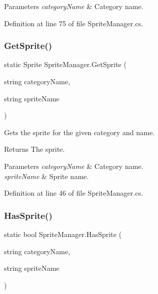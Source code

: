 \begin{DoxyParams}{Parameters}
{\em category\+Name} & Category name.\\
\hline
\end{DoxyParams}


Definition at line 75 of file Sprite\+Manager.\+cs.

\mbox{\label{class_sprite_manager_a726f293c39df8c71073dfae36c8ac9ec}} 
\subsubsection{\texorpdfstring{Get\+Sprite()}{GetSprite()}}
{\footnotesize\ttfamily static Sprite Sprite\+Manager.\+Get\+Sprite (\begin{DoxyParamCaption}\item[{string}]{category\+Name,  }\item[{string}]{sprite\+Name }\end{DoxyParamCaption})\hspace{0.3cm}{\ttfamily [static]}}



Gets the sprite for the given category and name. 

\begin{DoxyReturn}{Returns}
The sprite.
\end{DoxyReturn}

\begin{DoxyParams}{Parameters}
{\em category\+Name} & Category name.\\
\hline
{\em sprite\+Name} & Sprite name.\\
\hline
\end{DoxyParams}


Definition at line 46 of file Sprite\+Manager.\+cs.

\mbox{\label{class_sprite_manager_a1eed6966816d35c500887cc0094b6b26}} 
\subsubsection{\texorpdfstring{Has\+Sprite()}{HasSprite()}}
{\footnotesize\ttfamily static bool Sprite\+Manager.\+Has\+Sprite (\begin{DoxyParamCaption}\item[{string}]{category\+Name,  }\item[{string}]{sprite\+Name }\end{DoxyParamCaption})\hspace{0.3cm}{\ttfamily [static]}}



